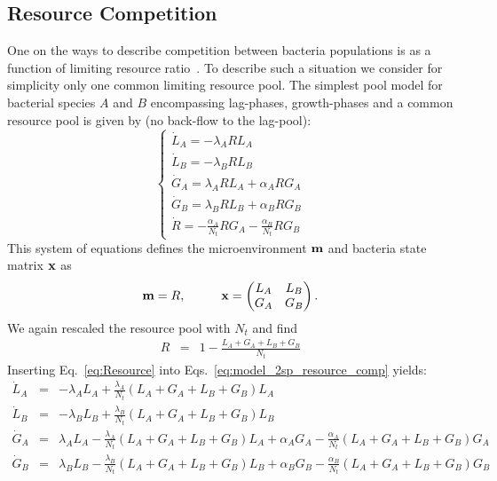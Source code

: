 \documentclass[10pt,A4paper]{article}
\begin{document}
\subsection{Resource Competition}
One on the ways to describe competition between bacteria populations is as a function of limiting resource ratio~\cite{tilman_resource_1977, smith_effects_2002}.
To describe such a situation we consider for simplicity only one common limiting resource pool. 
The simplest pool model for bacterial species $A$ and $B$ encompassing lag-phases, growth-phases and a common resource pool is given by (no back-flow to the lag-pool):
\begin{equation}
    \begin{cases}
        \dot{L}_A = - \lambda_A R L_A\\
        \dot{L}_B = - \lambda_B R L_B \\
        \dot{G}_A = \lambda_A R L_A +\alpha_A R G_A\\
        \dot{G}_B = \lambda_B R L_B +\alpha_B R G_B\\
        \dot{R} =-\frac{\alpha_A}{N_t} R G_A-\frac{\alpha_B}{N_t} R G_B
    \end{cases}
    \label{eq:model_2sp_resource_comp}
\end{equation}
This system of equations defines the microenvironment $\mathbf{m}$ and bacteria state matrix $\mathbf{x}$ as
\begin{equation}
    \mathbf{m} = R, \hspace{1cm}
    \mathbf{x} = \begin{pmatrix}
        L_A & L_B \\
        G_A & G_B 
    \end{pmatrix}.
\end{equation}
We again rescaled the resource pool with $N_t$ and find
\begin{eqnarray}
\label{eq:Resource}
R &=&1-\frac{L_A+G_A+L_B+G_B}{N_t}
\end{eqnarray}
Inserting Eq.~\ref{eq:Resource} into Eqs.~\ref{eq:model_2sp_resource_comp} yields:
\begin{eqnarray*}
    \dot{L}_A &=& - \lambda_A  L_A + \frac{\lambda_A}{N_t}\left(L_A+G_A+L_B+G_B\right)L_A\\
    \dot{L}_B &=& - \lambda_B L_B + \frac{\lambda_B}{N_t}\left(L_A+G_A+L_B+G_B\right)L_B \\
    \dot{G}_A &=&  \lambda_A  L_A - \frac{\lambda_A}{N_t}\left(L_A+G_A+L_B+G_B\right)L_A +\alpha_A G_A - \frac{\alpha_A}{N_t}\left(L_A+G_A+L_B+G_B\right)G_A\\
    \dot{G}_B &=&  \lambda_B L_B - \frac{\lambda_B}{N_t}\left(L_A+G_A+L_B+G_B\right)L_B  +\alpha_B G_B -\frac{\alpha_B}{N_t}\left(L_A+G_A+L_B+G_B\right)G_B
\end{eqnarray*}
\end{document}
